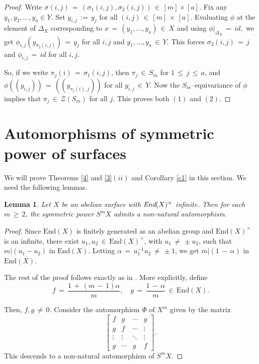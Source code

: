 \documentclass[12pt,reqno]{amsart}
\newtheorem{lemma}{Lemma}[section]
\theoremstyle{definition}
\numberwithin{equation}{section}
\begin{document}
\begin{proof}
Write $\sigma(i,j)\,=\,(\sigma_1(i,j), \sigma_2(i,j))\,\in \,[m]\times [a].$ Fix any $y_1, y_2,\ldots,y_a\in Y.$ Set $y_{i,j}\,:=\,y_j$ for all $(i,j)\,\in\, [m]\,\times\, [a]$. Evaluating $\phi$ at the element of $\Delta_X$ corresponding to $x\,=\,(y_1,\ldots,y_a)\,\in\, X$ and using $\phi|_{\Delta_X}\,=\,id,$ we get $\phi_{i,j}(y_{\sigma_2(i,j)})\,=\,y_j$ for all $i,j$ and $y_1,\ldots,y_a\,\in\, Y$. This forces $\sigma_2(i,j)\,=\,j$ and $\phi_{i,j}\,=\,id$ for all $i,j.$

So, if we write $\pi_j(i)\,=\,\sigma_1(i,j)$, then $\pi_j\,\in\, S_m$ for $1\,\leq\, j\,\leq\, a$, and $\phi((y_{i,j}))\,=\,((y_{\pi_j(i),j}))$ for all $y_{i,j}\,\in\, Y.$ Now the $S_m$--equivariance of $\phi$ implies that $\pi_j\,\in\, \mathcal{Z}(S_m)$ for all $j$. This proves both $(1)$ and $(2).$
\end{proof}

     
 \section{Automorphisms of symmetric power of surfaces}

We will prove Theorems \ref{4} and \ref{3}$(ii)$ and Corollary \ref{c1} in this section. We need the following lemmas.

\begin{lemma}\label{infinite}
Let $X$ be an abelian surface with $\emph{End}(X)^{\times}$ infinite. Then for each $m\,\geq\,2$, the symmetric power $S^{m}X$ admits a non-natural automorphism.
\end{lemma}
\begin{proof}
Since $\textrm{End}(X)$ is finitely generated as an abelian group and $\textrm{End}(X)^{\times}$ is an infinite, there exist $u_1, u_2\,\in\, \textrm{End}(X)^{\times}$, with $u_1\,\neq\, \pm u_2$, such that $m| (u_1-u_2)$ in $\textrm{End}(X)$. Letting $\alpha\,=\,u_1^{-1}u_2\,\neq\, \pm 1$, we get $m|(1\,-\,\alpha)$ in $\textrm{End}(X)$. 

The rest of the proof follows exactly as in \cite{Sas}. More explicitly, define
$$f\,=\, \frac{1\,+\,(m\,-\,1)\alpha}{m},\quad g\,=\, \frac{1\,-\,\alpha}{m}\,\in\, \textrm{End}(X).$$ 

Then, $f, g\,\neq\, 0.$ Consider the automorphism  $\Phi$ of $X^{m}$ given by the matrix 
\[
\begin{bmatrix}
f & g & \cdots & g \\
g & f & \cdots & \vdots \\
\vdots & \vdots & \ddots & \vdots \\
g & \cdots & g & f
\end{bmatrix}.
\]
This descends to a non-natural automorphism of $S^{m}X$. 
  
\end{proof}
\end{document}
